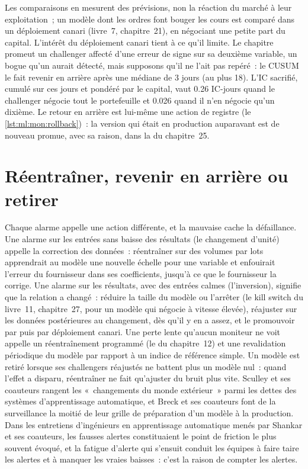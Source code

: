 Les comparaisons en  mesurent des prévisions, non la réaction du marché à leur exploitation~; un modèle dont les ordres font bouger les cours est comparé
dans un déploiement canari (livre~7, chapitre~21), en négociant une petite part du capital. L'intérêt du déploiement canari tient à ce qu'il limite. Le
chapitre promeut un challenger affecté d'une erreur de signe sur sa deuxième variable, un bogue qu'un  aurait détecté, mais supposons qu'il ne l'ait pas repéré~:
le CUSUM le fait revenir en arrière après une médiane de 3 jours (au plus 18). L'IC sacrifié, cumulé sur ces jours
et pondéré par le capital, vaut 0.26 IC-jours quand le challenger négocie tout le portefeuille et 0.026 quand il n'en négocie qu'un dixième. Le
retour en arrière est lui-même une action de registre (le \cref{lst:ml:mon:rollback})~: la version qui était en production auparavant est de nouveau promue,
avec sa raison, dans la  du chapitre~25.

\section{Réentraîner, revenir en arrière ou retirer}

Chaque alarme appelle une action différente, et la mauvaise cache la défaillance. Une alarme sur les entrées sans baisse des résultats (le changement
d'unité) appelle la correction des données~: réentraîner sur des volumes par lots apprendrait au modèle une nouvelle échelle pour une variable et enfouirait
l'erreur du fournisseur dans ses coefficients, jusqu'à ce que le fournisseur la corrige. Une alarme sur les résultats, avec des entrées calmes (l'inversion), signifie que la
relation a changé~: réduire la taille du modèle ou l'arrêter (le kill switch du livre~11, chapitre~27, pour un modèle qui négocie à vitesse élevée),
réajuster sur les données postérieures au changement, dès qu'il y en a assez, et le promouvoir par  puis par déploiement canari. Une perte lente qu'aucun moniteur
ne voit appelle un réentraînement programmé (le  du chapitre~12) et une revalidation périodique du modèle par rapport à un
indice de référence simple. Un modèle est retiré lorsque ses challengers réajustés ne battent plus un modèle nul~: quand l'effet a disparu, réentraîner
ne fait qu'ajuster du bruit plus vite. Sculley et ses coauteurs rangent les «~changements du monde extérieur~» parmi les dettes des
systèmes d'apprentissage automatique, et Breck et ses coauteurs font de la surveillance la moitié de leur grille de préparation d'un modèle à la production. Dans les entretiens
d'ingénieurs en apprentissage automatique menés par Shankar et ses coauteurs, les fausses alertes constituaient le point de friction le plus souvent évoqué, et
la fatigue d'alerte qui s'ensuit conduit les équipes à faire taire les alertes et à manquer les vraies baisses~: c'est la raison de compter les alertes.

